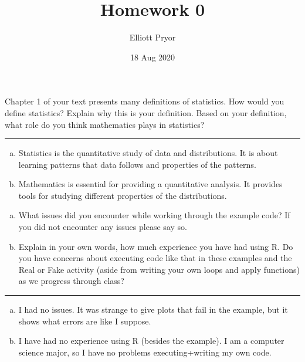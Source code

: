 \documentclass[11pt]{article}
\title{Homework 0}
\author{Elliott Pryor}
\date{18 Aug 2020}
\begin{document}
\maketitle


Chapter 1 of your text presents many definitions of statistics. How would you define statistics? Explain why this is your definition. Based on your definition, what role do you think mathematics plays in statistics?
\hrule

\begin{enumerate}[a)]
	\item Statistics is the quantitative study of data and distributions. It is about learning patterns that data follows and properties of the patterns.
	\item Mathematics is essential for providing a quantitative analysis. It provides tools for studying different properties of the distributions. 
\end{enumerate}


\begin{enumerate}[a)]
	\item What issues did you encounter while working through the example code? If you did not encounter any issues please say so.
	\item Explain in your own words, how much experience you have had using R. Do you have concerns about executing code like that in these examples and the Real or Fake activity (aside from writing your own loops and apply functions) as we progress through class?
\end{enumerate}
\hrule

\begin{enumerate}[a)]
	\item I had no issues. It was strange to give plots that fail in the example, but it shows what errors are like I suppose.
	
	\item I have had no experience using R (besides the example). I am a computer science major, so I have no problems executing+writing my own code. 

\end{enumerate}
\end{document}
